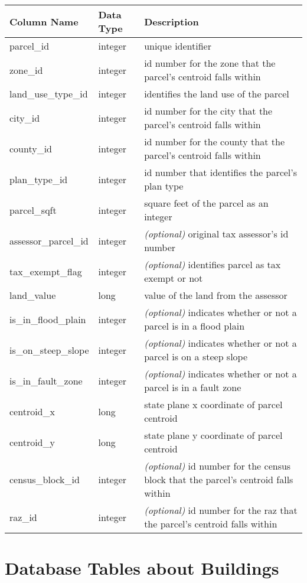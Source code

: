 \begin{tabular}{p{2in}lp{3.5in}}
\textbf{Column Name} & \textbf{Data Type} & \textbf{Description} \\
\hline
parcel\_id & integer & unique identifier \\ \hline
zone\_id & integer &  id number for the zone that the parcel's centroid falls within \\ \hline
land\_use\_type\_id & integer & identifies the land use of the parcel \\ \hline
city\_id & integer & id number for the city that the parcel's centroid falls within \\ \hline
county\_id & integer & id number for the county that the parcel's centroid falls within\\ \hline
plan\_type\_id & integer & id number that identifies the parcel's plan type\\ \hline
parcel\_sqft & integer & square feet of the parcel as an integer \\ \hline
assessor\_parcel\_id & integer & \emph{(optional)} original tax assessor's id number\\ \hline
tax\_exempt\_flag & integer & \emph{(optional)} identifies parcel as tax exempt or not\\ \hline
land\_value & long & value of the land from the assessor \\ \hline
is\_in\_flood\_plain & integer & \emph{(optional)} indicates whether or not a parcel is in a flood plain\\ \hline
is\_on\_steep\_slope & integer & \emph{(optional)} indicates whether or not a parcel is on a steep slope\\ \hline
is\_in\_fault\_zone & integer & \emph{(optional)} indicates whether or not a parcel is in a fault zone\\ \hline
centroid\_x & long & state plane x coordinate of parcel centroid \\ \hline
centroid\_y & long & state plane y coordinate of parcel centroid\\ \hline
census\_block\_id & integer &  \emph{(optional)} id number for the census block that the parcel's centroid falls within\\ \hline
raz\_id & integer & \emph{(optional)} id number for the raz that the parcel's centroid falls within\\ \hline
\end{tabular}

\section{Database Tables about Buildings}

